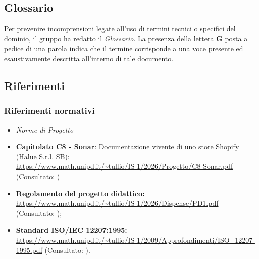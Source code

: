 \subsection{Glossario}
Per prevenire incomprensioni legate all'uso di termini tecnici o specifici del dominio, il gruppo ha redatto il \textit{Glossario}. La presenza della lettera \textbf{G} posta a pedice di una parola indica che il termine corrisponde a una voce presente ed esaustivamente descritta all'interno di tale documento.


\subsection{Riferimenti}

\subsubsection{Riferimenti normativi}
\begin{itemize}
    \item \textit{Norme di Progetto}
    \item \textbf{Capitolato C8 - Sonar}: Documentazione vivente di uno store Shopify (Halue S.r.l. SB):\\
    \url{https://www.math.unipd.it/~tullio/IS-1/2026/Progetto/C8-Sonar.pdf}\\
    (Consultato: )
    \item \textbf{Regolamento del progetto didattico:} \\
    \url{https://www.math.unipd.it/~tullio/IS-1/2026/Dispense/PD1.pdf} (Consultato: );
    \item \textbf{Standard ISO/IEC 12207:1995:} \\
    \url{https://www.math.unipd.it/~tullio/IS-1/2009/Approfondimenti/ISO_12207-1995.pdf} (Consultato: ).
\end{itemize}

